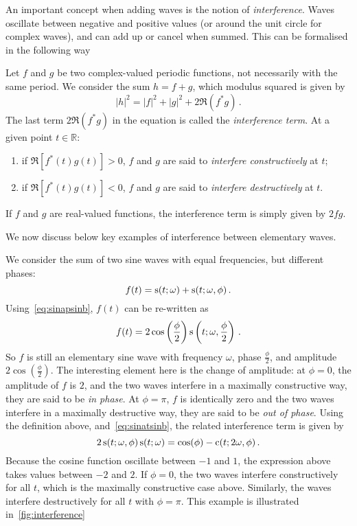 An important concept when adding waves is the notion of \emph{interference}. Waves
oscillate between negative and positive values (or around the unit circle for complex
waves), and can add up or cancel when summed. This can be formalised in the following way
\begin{definition}
  Let $f$ and $g$ be two complex-valued periodic functions, not necessarily with the same
  period. We consider the sum $h=f+g$, which modulus squared is given by
  \begin{equation}
    |h|^2=|f|^2+|g|^2+2\Re(f^*g)\,.
  \end{equation}
  The last term $2\Re(f^*g)$ in the equation is called the \emph{interference term}. At a
  given point $t\in\mathbb{R}$:
  \begin{enumerate}
    \item if $\Re[f^*(t)g(t)]>0$, $f$ and $g$ are said to \emph{interfere constructively}
      at $t$;
    \item if $\Re[f^*(t)g(t)]<0$, $f$ and $g$ are said to \emph{interfere destructively}
      at $t$.
  \end{enumerate}
  If $f$ and $g$ are real-valued functions, the interference term is simply given by
  $2fg$.
\end{definition}
We now discuss below key examples of interference between elementary waves.
\begin{example}
  We consider the sum of two sine waves with equal frequencies, but different phases:
  \begin{equation}
    f(t)=\operatorname{s}(t;\omega)+\operatorname{s}(t;\omega,\phi)\,.
  \end{equation}
  Using~\cref{eq:sinapsinb}, $f(t)$ can be re-written as
  \begin{equation}
    f(t)=2\cos\left(\frac{\phi}{2}\right)\operatorname{s}\left(t;\omega,\frac{\phi}{2}\right)\,.
  \end{equation}
  So $f$ is still an elementary sine wave with frequency $\omega$, phase $\frac{\phi}{2}$,
  and amplitude $2\cos(\frac{\phi}{2})$. The interesting element here is the change of
  amplitude: at $\phi=0$, the amplitude of $f$ is $2$, and the two waves interfere in a
  maximally constructive way, they are said to be \emph{in phase}. At $\phi=\pi$, $f$ is
  identically zero and the two waves interfere in a maximally destructive way, they are
  said to be \emph{out of phase}. Using the definition above, and~\cref{eq:sinatsinb}, the
  related interference term is given by
  \begin{equation}
    2\operatorname{s}(t;\omega,\phi)\operatorname{s}(t;\omega)=\cos(\phi)-\operatorname{c}(t;2\omega,\phi)\,.
  \end{equation}
  Because the cosine function oscillate between $-1$ and $1$, the expression above takes
  values between $-2$ and $2$. If $\phi=0$, the two waves interfere constructively for all
  $t$, which is the maximally constructive case above. Similarly, the waves interfere
  destructively for all $t$ with $\phi=\pi$. This example is illustrated
  in~\cref{fig:interference}
\end{example}
